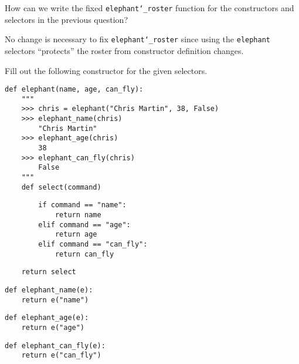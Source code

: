 \begin{blocksection}
\question How can we write the fixed \texttt{elephant\char`_roster} function for
the constructors and selectors in the previous question?

\begin{solution}[1.5in]
No change is necessary to fix \texttt{elephant\char`_roster} since using the
\texttt{elephant} selectors ``protects'' the roster from constructor definition
changes.
\end{solution}

\end{blocksection}

\begin{blocksection}
\question Fill out the following constructor for the given
selectors.

\begin{lstlisting}
def elephant(name, age, can_fly):
    """
    >>> chris = elephant("Chris Martin", 38, False)
    >>> elephant_name(chris)
        "Chris Martin"
    >>> elephant_age(chris)
        38
    >>> elephant_can_fly(chris)
        False
    """
    def select(command)
\end{lstlisting}
\begin{solution}[2in]
\begin{lstlisting}
        if command == "name":
            return name
        elif command == "age":
            return age
        elif command == "can_fly":
            return can_fly
\end{lstlisting}
\end{solution}

\begin{lstlisting}
    return select
\end{lstlisting}

\begin{lstlisting}
def elephant_name(e):
    return e("name")
\end{lstlisting}

\begin{lstlisting}
def elephant_age(e):
    return e("age")
\end{lstlisting}

\begin{lstlisting}
def elephant_can_fly(e):
    return e("can_fly")
\end{lstlisting}

\end{blocksection}